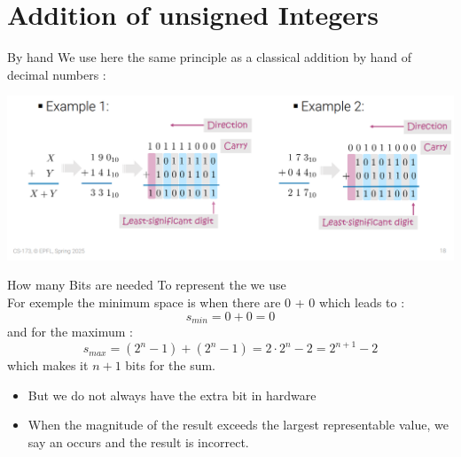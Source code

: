 \section{Addition of unsigned Integers}
\begin{parag}{By hand}
    We use here the same principle as a classical addition by hand of decimal numbers : 
\end{parag}
    \begin{center}
    \includegraphics[scale=0.4]{Capture d’écran (112).png}
    \end{center}
\begin{parag}{How many Bits are needed}
    To represent the  we use 
    \\
    For exemple the minimum space is when there are $0$ + $0$ which leads to : 
    \[s_{min} = 0 + 0 = 0\]
    and for the maximum : 
    \[s_{max} = (2^n - 1 ) + (2^n - 1) = 2\cdot 2^n -2 = 2^{n+1} - 2\]
    which makes it $n + 1$ bits for the sum.
    \begin{itemize}
        \item But we do not always have the extra bit in hardware
        \item When the magnitude of the result exceeds the largest representable value,  we say an  occurs and the result is incorrect.
    \end{itemize}
\end{parag}    
